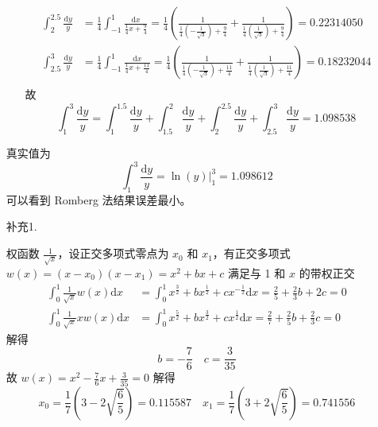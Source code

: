 \documentclass{sjtuarticle}
\def\dd{\mathrm{d}}
\begin{document}
\begin{itemize}
\begin{solution}
\begin{itemize}
\begin{align*}
                \int_{2}^{2.5} \frac{\dd y}{y}&=\frac{1}{4}\int_{-1}^1 \frac{\dd x}{\frac{1}{4}x+\frac{9}{4}}=\frac{1}{4}\left(\frac{1}{\frac{1}{4}\left(-\frac{1}{\sqrt{3}}\right)+\frac{9}{4}}+\frac{1}{\frac{1}{4}\left(\frac{1}{\sqrt{3}}\right)+\frac{9}{4}}\right)=0.22314050\\
                \int_{2.5}^{3} \frac{\dd y}{y}&=\frac{1}{4}\int_{-1}^1 \frac{\dd x}{\frac{1}{4}x+\frac{11}{4}}=\frac{1}{4}\left(\frac{1}{\frac{1}{4}\left(-\frac{1}{\sqrt{3}}\right)+\frac{11}{4}}+\frac{1}{\frac{1}{4}\left(\frac{1}{\sqrt{3}}\right)+\frac{11}{4}}\right)=0.18232044\\
            \end{align*}
            故
            \begin{equation*}
                \int_{1}^{3} \frac{\dd y}{y} = \int_{1}^{1.5} \frac{\dd y}{y} + \int_{1.5}^{2} \frac{\dd y}{y} + \int_{2}^{2.5} \frac{\dd y}{y}+ \int_{2.5}^{3} \frac{\dd y}{y}=1.098538
            \end{equation*}
        \end{itemize}
        真实值为
        \begin{equation*}
            \int_1^3 \frac{\dd y}{y} = \ln(y)\bigg|_1^3 = 1.098612
        \end{equation*}
        可以看到 Romberg 法结果误差最小。
    \end{solution}
    \item[补充1.] \begin{solution}
        权函数 $\frac{1}{\sqrt{x}}$，设正交多项式零点为 $x_0$ 和 $x_1$，有正交多项式 $w(x)=(x-x_0)(x-x_1)=x^2+bx+c$ 满足与 1 和 $x$ 的带权正交
        \begin{align*}
            \int_0^1 \frac{1}{\sqrt{x}}w(x)\dd x&=\int_0^1 x^{\frac{3}{2}}+bx^{\frac{1}{2}}+cx^{-\frac{1}{2}}\dd x=\frac{2}{5}+\frac{2}{3}b+2c=0\\
            \int_0^1 \frac{1}{\sqrt{x}}xw(x)\dd x&=\int_0^1 x^{\frac{5}{2}}+bx^{\frac{3}{2}}+cx^{\frac{1}{2}}\dd x=\frac{2}{7}+\frac{2}{5}b+\frac{2}{3}c=0
        \end{align*}
        解得
        \begin{equation*}
            b =-\frac{7}{6} \quad c = \frac{3}{35}
        \end{equation*}
        故 $w(x)=x^2-\frac{7}{6}x+\frac{3}{35}=0$ 解得
        \begin{equation*}
            x_0=\frac{1}{7}\left(3-2\sqrt{\frac{6}{5}}\right)=0.115587\quad x_1=\frac{1}{7}\left(3+2\sqrt{\frac{6}{5}}\right)=0.741556
        \end{equation*}

\end{solution}
\end{itemize}
\end{document}
